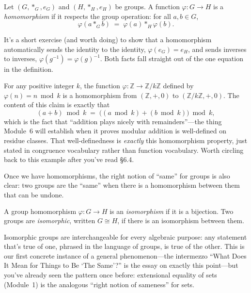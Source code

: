 \documentclass[11pt]{article}
\begin{document}
\begin{definition}
Let $(G, *_G, e_G)$ and $(H, *_H, e_H)$ be groups. A function $\varphi : G \to H$ is a \emph{homomorphism} if it respects the group operation: for all $a, b \in G$,
\[
  \varphi(a *_G b) \;=\; \varphi(a) *_H \varphi(b).
\]
\end{definition}

It's a short exercise (and worth doing) to show that a homomorphism automatically sends the identity to the identity, $\varphi(e_G) = e_H$, and sends inverses to inverses, $\varphi(g^{-1}) = \varphi(g)^{-1}$. Both facts fall straight out of the one equation in the definition.

\begin{example}
For any positive integer $k$, the function $\varphi : \mathbb{Z} \to \mathbb{Z}/k\mathbb{Z}$ defined by $\varphi(n) = n \bmod k$ is a homomorphism from $(\mathbb{Z}, +, 0)$ to $(\mathbb{Z}/k\mathbb{Z}, +, 0)$. The content of this claim is exactly that
\[
  (a + b) \bmod k \;=\; \bigl((a \bmod k) + (b \bmod k)\bigr) \bmod k,
\]
which is the fact that ``addition plays nicely with remainders''---the thing Module~6 will establish when it proves modular addition is well-defined on residue classes. That well-definedness is \emph{exactly} this homomorphism property, just stated in congruence vocabulary rather than function vocabulary. Worth circling back to this example after you've read §6.4.
\end{example}

Once we have homomorphisms, the right notion of ``same'' for groups is also clear: two groups are the ``same'' when there is a homomorphism between them that can be undone.

\begin{definition}[Isomorphism]
A group homomorphism $\varphi : G \to H$ is an \emph{isomorphism} if it is a bijection. Two groups are \emph{isomorphic}, written $G \cong H$, if there is an isomorphism between them.
\end{definition}

Isomorphic groups are interchangeable for every algebraic purpose: any statement that's true of one, phrased in the language of groups, is true of the other. This is our first concrete instance of a general phenomenon---the intermezzo ``What Does It Mean for Things to Be `The Same'?'' is the essay on exactly this point---but you've already seen the pattern once before: extensional equality of sets (Module~1) is the analogous ``right notion of sameness'' for sets.
\end{document}
